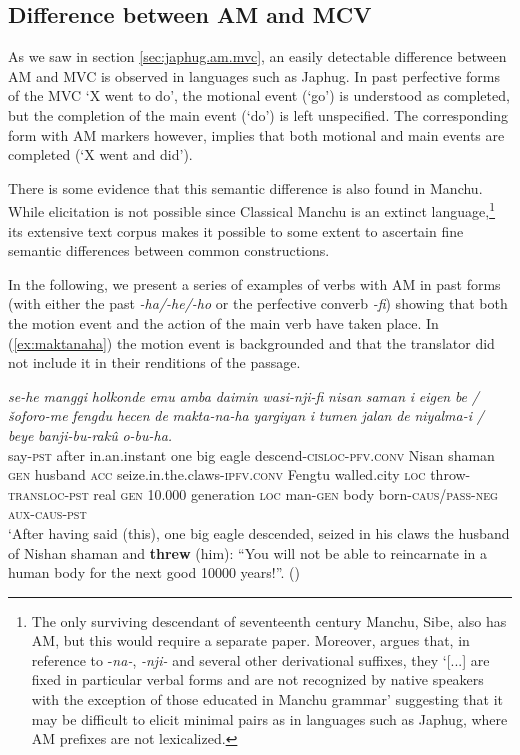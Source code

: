\documentclass{article}
\newcommand{\ipa}[1]{\textit{{\phon\mbox{#1}}}} %
\begin{document}
\subsection{Difference between AM and MCV} \label{sec:mvc.manchu}
As we saw in section \ref{sec:japhug.am.mvc}, an easily detectable difference between AM and MVC is observed in languages such as Japhug. In past perfective forms of the MVC ‘X went to do’, the motional event (‘go’) is understood as completed, but the completion of the main event (‘do’) is left unspecified. The corresponding form with AM markers however, implies that both motional and main events are completed (‘X went and did’). 

There is some evidence that this semantic difference is also found in Manchu. While elicitation is not possible since Classical Manchu is an extinct language,\footnote{The only surviving descendant of seventeenth century Manchu, Sibe, also has AM, but this would require a separate paper. Moreover, \citet[178]{zikmundova13sibe} argues that, in reference to -\ipa{na-}, \ipa{-nji-} and several other derivational suffixes, they `[...] are fixed in particular verbal forms and are not recognized by native speakers with the exception of those educated in Manchu grammar' suggesting that it may be difficult to elicit minimal pairs as in languages such as Japhug, where AM prefixes are not lexicalized. } its extensive text corpus makes it possible to some extent to ascertain fine semantic differences between common constructions.

In the following, we present a series of examples of verbs with AM in past forms (with either the past \ipa{-ha/-he/-ho} or the perfective converb \ipa{-fi}) showing that both the motion event and the action of the main verb have taken place. In (\ref{ex:maktanaha}) the motion event is backgrounded and that the translator did not include it in their renditions of the passage.

\begin{exe}
\ex  \label{ex:maktanaha}
\gll
\ipa{se-he} 	\ipa{manggi} 	\ipa{holkonde} 	\ipa{emu} 	\ipa{amba} 	\ipa{daimin} 	\ipa{wasi-nji-fi} 	\ipa{nisan} 	\ipa{saman} 	\ipa{i} 	\ipa{eigen} 	\ipa{be} 	\ipa{/} 	\ipa{šoforo-me} 	\ipa{fengdu} 	\ipa{hecen} 	\ipa{de} 	\ipa{makta-na-ha} 	\ipa{yargiyan} 	\ipa{i} 	\ipa{tumen} 	\ipa{jalan} 	\ipa{de} 	\ipa{niyalma-i} 	\ipa{/} 	\ipa{beye} 	\ipa{banji-bu-rakû} 	\ipa{o-bu-ha.} \\
say-\textsc{pst} after in.an.instant one big eagle descend-\textsc{cisloc}-\textsc{pfv.conv} Nisan shaman \textsc{gen} husband \textsc{acc} { } seize.in.the.claws-\textsc{ipfv.conv} Fengtu walled.city \textsc{loc} throw-\textsc{transloc-pst} real \textsc{gen} 10.000 generation \textsc{loc} man-\textsc{gen} { } body born-\textsc{caus/pass-neg} \textsc{aux-caus-pst} \\
\glt `After having said (this), one big eagle descended, seized in his claws the husband of Nishan shaman and \textbf{threw} (him): “You will not be able to reincarnate in a human body for the next good 10000 years!”. (\citealt[85,20b/119]{jaxontov93nisan})
\end{exe}
\end{document}
